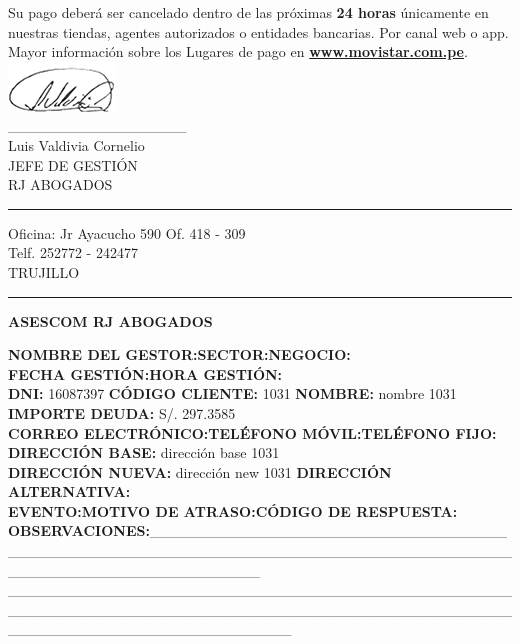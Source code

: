 \noindent Su pago deberá ser cancelado dentro de las próximas \textbf{24 horas} únicamente en nuestras tiendas, agentes autorizados o entidades bancarias. Por canal web o app.  Mayor información sobre los Lugares de pago en
\underline{\textcolor[rgb]{0.00,0.07,1.00}{\textbf{www.movistar.com.pe}}}.\\

\noindent \includegraphics[natwidth=2.831041667cm, natheight=1.322916667cm]{resources/lawyer_signature.png}\\
\_\_\_\_\_\_\_\_\_\_\_\_\_\_\_\_\_\\
{\small Luis Valdivia Cornelio\\
JEFE DE GESTIÓN\\
RJ ABOGADOS}\\


\textcolor[rgb]{1.00,0.00,0.00}{\hrule}
\vspace{0.2cm}
{\noindent\footnotesize Oficina: Jr Ayacucho 590 Of. 418 - 309\\
Telf. 252772 - 242477\\
TRUJILLO}

\textcolor[rgb]{0.00,0.00,0.00}{\hrule}

\begin{center}
\textbf{\footnotesize ASESCOM RJ ABOGADOS}
\end{center}
{\noindent\footnotesize
\textbf{NOMBRE DEL GESTOR:}\hfill \textbf{SECTOR:}\hfill \textbf{NEGOCIO:}\hfill \space\\
\textbf{FECHA GESTIÓN:}\hfill \textbf{HORA GESTIÓN:}\hfill \space\\
\textbf{DNI:} 16087397 \hfill \textbf{CÓDIGO CLIENTE:} 1031 \hfill \textbf{NOMBRE:} nombre 1031 \hfill	\textbf{IMPORTE DEUDA:} S/. 297.3585\\
\textbf{CORREO ELECTRÓNICO:}\hfill \textbf{TELÉFONO MÓVIL:}\hfill	\textbf{TELÉFONO FIJO:}\hfill \space\\
\textbf{DIRECCIÓN BASE:} dirección base 1031\\
\textbf{DIRECCIÓN NUEVA:} dirección new 1031 \hfill \textbf{DIRECCIÓN ALTERNATIVA:} \hfill \space\\
\textbf{EVENTO:}\hfill \textbf{MOTIVO DE ATRASO:}\hfill \textbf{CÓDIGO DE RESPUESTA:}\hfill \space\\
\textbf{OBSERVACIONES:}\_\_\_\_\_\_\_\_\_\_\_\_\_\_\_\_\_\_\_\_\_\_\_\_\_\_\_\_\_\_\_\_\_\_\_\_\_\_\_\_\_\_\_\_\_\_\_\_\_\_\_\_\_\_\_\_\_\_\_\_\_\_\_\_\_\_\_\_\_\_\_\_\_\_\_\_\_\_\_\_\_\_\_\_\_\_\_\_\_\_\_\_\_\_\_\_\_\_\_\_\_\_\_\_\_\_\\
\_\_\_\_\_\_\_\_\_\_\_\_\_\_\_\_\_\_\_\_\_\_\_\_\_\_\_\_\_\_\_\_\_\_\_\_\_\_\_\_\_\_\_\_\_\_\_\_\_\_\_\_\_\_\_\_\_\_\_\_\_\_\_\_\_\_\_\_\_\_\_\_\_\_\_\_\_\_\_\_\_\_\_\_\_\_\_\_\_\_\_\_\_\_\_\_\_\_\_\_\_\_\_\_\_\_\_\_\_\_\_\_\_\_\_\_\_\_\_\_\_\_\_
}


